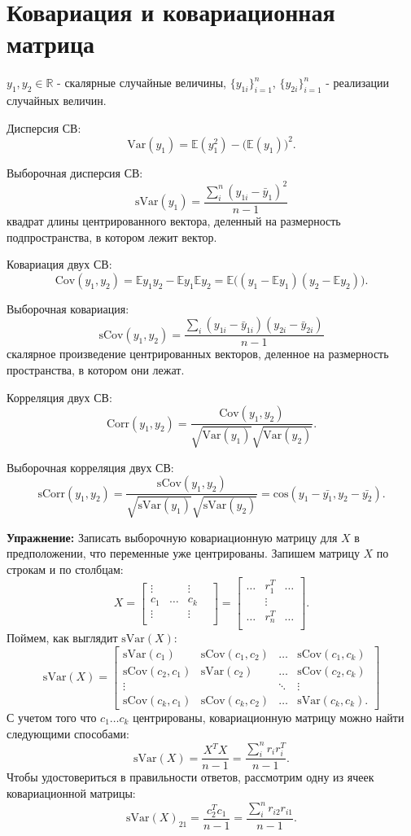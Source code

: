 \documentclass[12pt]{article} %
\theoremstyle{definition} %
\begin{document}
\section{Ковариация и ковариационная матрица}
$y_1, y_2 \in \mathbb{R}$ - скалярные случайные величины, 
$\{y_{1i}\}_{i=1}^n$, $\{y_{2i}\}_{i=1}^n$ - реализации случайных величин.

Дисперсия СВ:
$$\text{Var}(y_1) = \mathbb{E}(y_1^2) - \big( \mathbb{E}(y_1) \big)^2.$$

Выборочная дисперсия СВ:
$$\text{sVar}(y_1) = \frac{\sum_{i}^n (y_{1i} - \bar{y}_1)^2}{n-1}$$
квадрат длины центрированного вектора, деленный на размерность подпространства, в котором лежит вектор. 

Ковариация двух СВ:
$$\text{Cov}(y_1, y_2) = \mathbb{E}y_1 y_2 - \mathbb{E}y_1 \mathbb{E}y_2= \mathbb{E} \bigg( (y_1 - \mathbb{E}y_1) (y_2 - \mathbb{E}y_2) \bigg).$$

Выборочная ковариация:
$$\text{sCov}(y_1, y_2) = \frac{\sum_i (y_{1i} - \bar{y}_{1i}) (y_{2i} - \bar{y}_{2i})}{n-1}$$
скалярное произведение центрированных векторов, деленное на размерность пространства, в котором они лежат.

Корреляция двух СВ:
$$\text{Corr}(y_1, y_2) = \frac{\text{Cov}(y_1, y_2)}
{\sqrt{\text{Var}(y_1)} \sqrt{\text{Var}(y_2)} }. $$

Выборочная корреляция двух СВ:
$$\text{sCorr}(y_1, y_2) = \frac{\text{sCov}(y_1, y_2)}
{\sqrt{\text{sVar}(y_1)} \sqrt{\text{sVar}(y_2)} } = 
\text{cos} (y_1 - \bar{y_1}, y_2 - \bar{y_2}). $$

\textbf{Упражнение:}
Записать выборочную ковариационную матрицу для $X$ в предположении, что переменные уже центрированы. Запишем матрицу $X$ по строкам и по столбцам:
$$
X = \begin{bmatrix} 
    \vdots &  & \vdots & \\
    c_1 & \dots & c_k \\
    \vdots &  & \vdots & \\
    \end{bmatrix}
    = 
    \begin{bmatrix} 
    \dots & r_{1}^T & \dots \\
    & \vdots & \\
    \dots & r_{n}^T & \dots \\
    \end{bmatrix}.
$$
Поймем, как выглядит $\text{sVar}(X)$:
$$
\text{sVar}(X) = \begin{bmatrix}
\text{sVar}(c_1) & \text{sCov}(c_1, c_2) & \dots & \text{sCov}(c_1, c_k) \\
\text{sCov}(c_2, c_1) & \text{sVar}(c_2) & \dots & \text{sCov}(c_2, c_k) \\
\vdots & & \ddots & \vdots\\
\text{sCov}(c_k, c_1) & \text{sCov}(c_k, c_2) & \dots & \text{sVar}(c_k, c_k).
\end{bmatrix}
$$
С учетом того что $c_1 \dots c_k$ центрированы, ковариационную матрицу можно найти следующими способами:
$$\text{sVar}(X) = \frac{X^TX}{n-1} = \frac{\sum_i^n r_i r_i^T}{n-1}.$$
Чтобы удостовериться в правильности ответов, рассмотрим одну из ячеек ковариационной матрицы:
$$\text{sVar}(X)_{21} = \frac{c_2^Tc_1}{n-1} = \frac{\sum_i^n r_{i2} r_{i1} }{n-1}. $$
\end{document}
